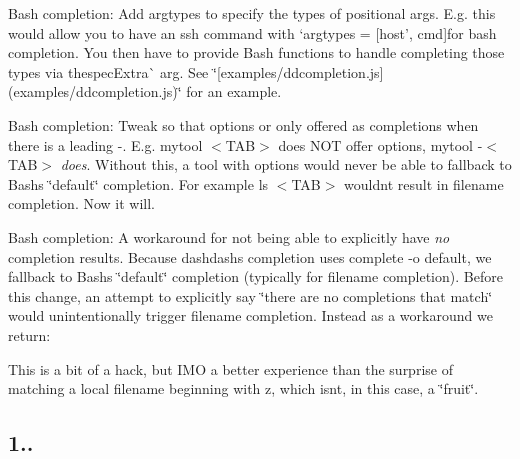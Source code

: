 \begin{DoxyItemize}
\item Bash completion\+: Add {\ttfamily argtypes} to specify the types of positional args. E.\+g. this would allow you to have an {\ttfamily ssh} command with `argtypes = \mbox{[}\textquotesingle{}host', \textquotesingle{}cmd\textquotesingle{}\mbox{]}{\ttfamily for bash completion. You then have to provide Bash functions to handle completing those types via the}spec\+Extra\`{} arg. See \char`\"{}\mbox{[}examples/ddcompletion.\+js\mbox{]}(examples/ddcompletion.\+js)\char`\"{} for an example.
\item Bash completion\+: Tweak so that options or only offered as completions when there is a leading \textquotesingle{}-\/\textquotesingle{}. E.\+g. {\ttfamily mytool $<$T\+AB$>$} does N\+OT offer options, {\ttfamily mytool -\/$<$T\+AB$>$} {\itshape does}. Without this, a tool with options would never be able to fallback to Bash\textquotesingle{}s \char`\"{}default\char`\"{} completion. For example {\ttfamily ls $<$T\+AB$>$} wouldn\textquotesingle{}t result in filename completion. Now it will.
\item Bash completion\+: A workaround for not being able to explicitly have {\itshape no} completion results. Because dashdash\textquotesingle{}s completion uses {\ttfamily complete -\/o default}, we fallback to Bash\textquotesingle{}s \char`\"{}default\char`\"{} completion (typically for filename completion). Before this change, an attempt to explicitly say \char`\"{}there are
  no completions that match\char`\"{} would unintentionally trigger filename completion. Instead as a workaround we return\+: 


This is a bit of a hack, but I\+MO a better experience than the surprise of matching a local filename beginning with \textquotesingle{}z\textquotesingle{}, which isn\textquotesingle{}t, in this case, a \char`\"{}fruit\char`\"{}.
\end{DoxyItemize}

\subsection*{1..}


